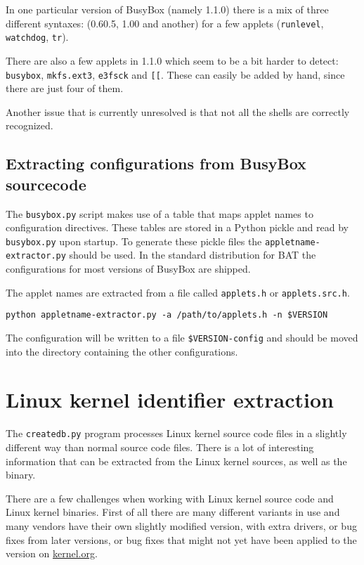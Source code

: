 \documentclass[10pt]{article}
\begin{document}
In one particular version of BusyBox (namely 1.1.0) there is a mix of three
different syntaxes: (0.60.5, 1.00 and another) for a few applets
(\texttt{runlevel}, \texttt{watchdog}, \texttt{tr}).

There are also a few applets in 1.1.0 which seem to be a bit harder to detect:
\texttt{busybox}, \texttt{mkfs.ext3}, \texttt{e3fsck} and \texttt{[[}. These
can easily be added by hand, since there are just four of them.

Another issue that is currently unresolved is that not all the shells are
correctly recognized.

\subsection{Extracting configurations from BusyBox sourcecode}

The \texttt{busybox.py} script makes use of a table that maps applet names to
configuration directives. These tables are stored in a Python pickle and read
by \texttt{busybox.py} upon startup. To generate these pickle files the
\texttt{appletname-extractor.py} should be used. In the standard distribution
for BAT the configurations for most versions of BusyBox are shipped.

The applet names are extracted from a file called \texttt{applets.h} or
\texttt{applets.src.h}.

\begin{verbatim}
python appletname-extractor.py -a /path/to/applets.h -n $VERSION
\end{verbatim}

The configuration will be written to a file \texttt{\$VERSION-config} and
should be moved into the directory containing the other configurations.

\section{Linux kernel identifier extraction}

The \texttt{createdb.py} program processes Linux kernel source code files in a
slightly different way than normal source code files. There is a lot of
interesting information that can be extracted from the Linux kernel sources,
as well as the binary.

There are a few challenges when working with Linux kernel source code and Linux
kernel binaries. First of all there are many different variants in use and many
vendors have their own slightly modified version, with extra drivers, or bug
fixes from later versions, or bug fixes that might not yet have been applied to
the version on \url{kernel.org}.
\end{document}
